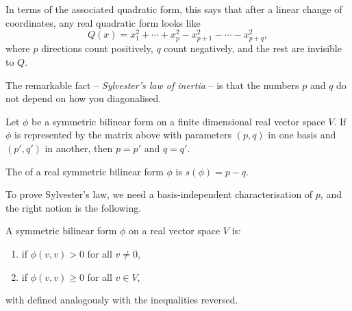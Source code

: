 In terms of the associated quadratic form, this says that after a linear change of coordinates, any real quadratic form looks like
$$
Q(x) = x_1^2 + \cdots + x_p^2 - x_{p+1}^2 - \cdots - x_{p + q}^2,
$$
where $p$ directions count positively, $q$ count negatively, and the rest are invisible to $Q$.
\begin{center}
\end{center}
The remarkable fact -- \emph{Sylvester's law of inertia} -- is that the numbers $p$ and $q$ do not depend on how you diagonalised.

\begin{theorem}
    Let $\phi$ be a symmetric bilinear form on a finite dimensional real vector space $V$. If $\phi$ is represented by the matrix above with parameters $(p, q)$ in one basis and $(p', q')$ in another, then $p = p'$ and $q = q'$.
\end{theorem}

\begin{definition}[Signature]
    The  of a real symmetric bilinear form $\phi$ is $s(\phi) = p - q$.
\end{definition}

To prove Sylvester's law, we need a basis-independent characterisation of $p$, and the right notion is the following.

\begin{definition}[Definiteness]
    A symmetric bilinear form $\phi$ on a real vector space $V$ is:
    \begin{enumerate}[label=(\roman*)]
        \item {} if $\phi(v, v) > 0$ for all $v \neq 0$,
        \item {} if $\phi(v,v) \geq 0$ for all $v \in V$,
    \end{enumerate}
    with  defined analogously with the inequalities reversed.
\end{definition}

